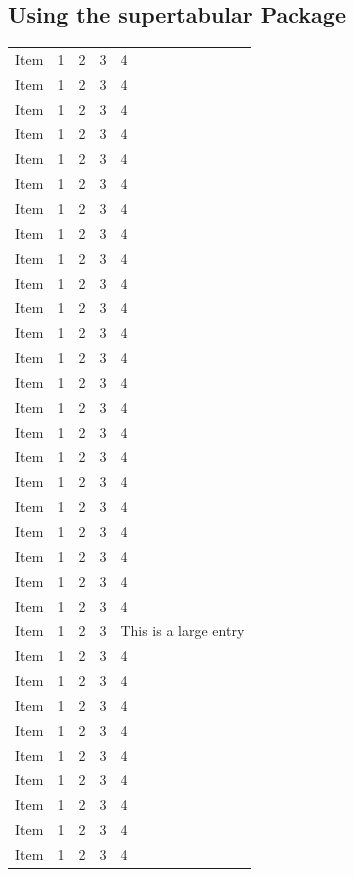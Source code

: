 \documentclass{article}
\begin{document}
	\subsection{Using the supertabular Package}
	\tablelasttail{\hline}
	\begin{center}
	\begin{supertabular}{|*{4}{c|}L|}
		Item & 1 & 2 & 3 & 4 \\
		Item & 1 & 2 & 3 & 4 \\
		Item & 1 & 2 & 3 & 4 \\
		Item & 1 & 2 & 3 & 4 \\
		Item & 1 & 2 & 3 & 4 \\
		Item & 1 & 2 & 3 & 4 \\
		Item & 1 & 2 & 3 & 4 \\
		Item & 1 & 2 & 3 & 4 \\
		Item & 1 & 2 & 3 & 4 \\
		Item & 1 & 2 & 3 & 4 \\
		Item & 1 & 2 & 3 & 4 \\
		Item & 1 & 2 & 3 & 4 \\
		Item & 1 & 2 & 3 & 4 \\
		Item & 1 & 2 & 3 & 4 \\
		Item & 1 & 2 & 3 & 4 \\
		Item & 1 & 2 & 3 & 4 \\
		Item & 1 & 2 & 3 & 4 \\
		Item & 1 & 2 & 3 & 4 \\
		Item & 1 & 2 & 3 & 4 \\
		Item & 1 & 2 & 3 & 4 \\
		Item & 1 & 2 & 3 & 4 \\
		Item & 1 & 2 & 3 & 4 \\
		Item & 1 & 2 & 3 & 4 \\
		Item & 1 & 2 & 3 & This is a large entry \\
		Item & 1 & 2 & 3 & 4 \\
		Item & 1 & 2 & 3 & 4 \\
		Item & 1 & 2 & 3 & 4 \\
		Item & 1 & 2 & 3 & 4 \\
		Item & 1 & 2 & 3 & 4 \\
		Item & 1 & 2 & 3 & 4 \\
		Item & 1 & 2 & 3 & 4 \\
		Item & 1 & 2 & 3 & 4 \\
		Item & 1 & 2 & 3 & 4 \\ 
	\end{supertabular}
	\end{center}
	
\end{document}
